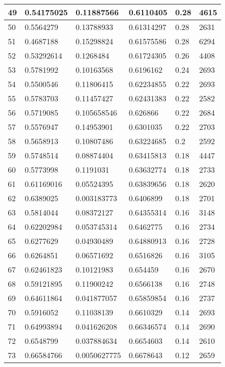 \begin{longtable}{|l|l|l|l|l|l|}
49 & 0.54175025 & 0.11887566 & 0.6110405 & 0.28 & 4615 \\ \hline 
50 & 0.5564279 & 0.13788933 & 0.61314297 & 0.28 & 2631 \\ \hline 
51 & 0.4687188 & 0.15298824 & 0.61575586 & 0.28 & 6294 \\ \hline 
52 & 0.53292614 & 0.1268484 & 0.61724305 & 0.26 & 4408 \\ \hline 
53 & 0.5781992 & 0.10163568 & 0.6196162 & 0.24 & 2693 \\ \hline 
54 & 0.5500546 & 0.11806415 & 0.62234855 & 0.22 & 2693 \\ \hline 
55 & 0.5783703 & 0.11457427 & 0.62431383 & 0.22 & 2582 \\ \hline 
56 & 0.5719085 & 0.105658546 & 0.626866 & 0.22 & 2684 \\ \hline 
57 & 0.5576947 & 0.14953901 & 0.6301035 & 0.22 & 2703 \\ \hline 
58 & 0.5658913 & 0.10807486 & 0.63224685 & 0.2 & 2592 \\ \hline 
59 & 0.5748514 & 0.08874404 & 0.63415813 & 0.18 & 4447 \\ \hline 
60 & 0.5773998 & 0.1191031 & 0.63632774 & 0.18 & 2733 \\ \hline 
61 & 0.61169016 & 0.05524395 & 0.63839656 & 0.18 & 2620 \\ \hline 
62 & 0.6389025 & 0.003183773 & 0.6406899 & 0.18 & 2701 \\ \hline 
63 & 0.5814044 & 0.08372127 & 0.64355314 & 0.16 & 3148 \\ \hline 
64 & 0.62202984 & 0.053745314 & 0.6462775 & 0.16 & 2734 \\ \hline 
65 & 0.6277629 & 0.04930489 & 0.64880913 & 0.16 & 2728 \\ \hline 
66 & 0.6264851 & 0.06571692 & 0.6516826 & 0.16 & 3105 \\ \hline 
67 & 0.62461823 & 0.10121983 & 0.654459 & 0.16 & 2670 \\ \hline 
68 & 0.59121895 & 0.11900242 & 0.6566138 & 0.16 & 2748 \\ \hline 
69 & 0.64611864 & 0.041877057 & 0.65859854 & 0.16 & 2737 \\ \hline 
70 & 0.5916052 & 0.11038139 & 0.6610329 & 0.14 & 2693 \\ \hline 
71 & 0.64993894 & 0.041626208 & 0.66346574 & 0.14 & 2690 \\ \hline 
72 & 0.6548799 & 0.037884634 & 0.6654603 & 0.14 & 2610 \\ \hline 
73 & 0.66584766 & 0.0050627775 & 0.6678643 & 0.12 & 2659 \\ \hline 

\end{longtable}
